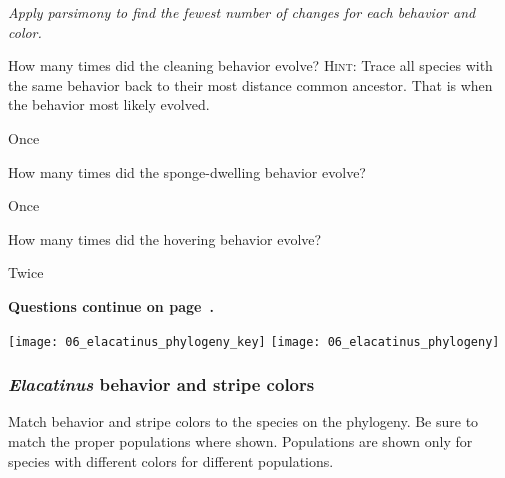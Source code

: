 \documentclass[12pt, hidelinks]{exam}
\newcommand*\AnswerBox[2]{%
    \parbox[t][#1]{0.92\textwidth}{%
    \begin{solution}#2\end{solution}}
    \vspace{\stretch{1}}
}
\begin{document}
\emph{Apply parsimony to find the fewest number of changes for each behavior and color.}
\begin{questions}

\question
How many times did the cleaning behavior evolve? \textsc{Hint:} Trace all species with the same behavior back to their most distance common ancestor. That is when the behavior most likely evolved.

\AnswerBox{0.5\baselineskip}{Once}

\question
How many times did the sponge-dwelling behavior evolve?

\AnswerBox{0.5\baselineskip}{Once}

\question
How many times did the hovering behavior evolve?

\AnswerBox{0.5\baselineskip}{Twice}

\hfill \textbf{Questions continue on page~\pageref{questions_continued}.}

\newpage

	\ifprintanswers
		\texttt{[image: 06\_elacatinus\_phylogeny\_key]}\label{phylogeny}
	\else
		\texttt{[image: 06\_elacatinus\_phylogeny]}\label{phylogeny}
	\fi
	
\newpage

\subsubsection*{\textit{Elacatinus} behavior and stripe colors}


Match behavior and stripe colors to the species on the phylogeny. Be sure to
match the proper populations where shown. Populations are shown only for
species with different colors for different populations.


\end{questions}
\end{document}
